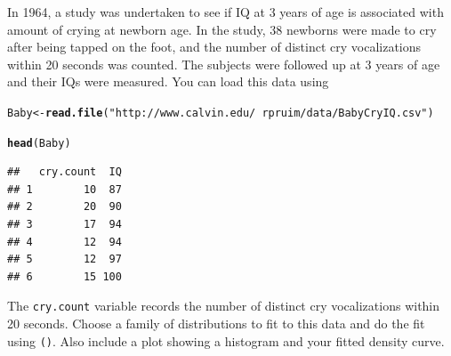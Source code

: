\documentclass[twoside]{book}\usepackage[]{graphicx}\usepackage[]{xcolor}
\makeatletter
\newcommand{\hlstr}[1]{\textcolor[rgb]{0.192,0.494,0.8}{#1}}%
\newcommand{\hlstd}[1]{\textcolor[rgb]{0.345,0.345,0.345}{#1}}%
\newcommand{\hlkwb}[1]{\textcolor[rgb]{0.69,0.353,0.396}{#1}}%
\newcommand{\hlkwd}[1]{\textcolor[rgb]{0.737,0.353,0.396}{\textbf{#1}}}%
\newenvironment{kframe}{%
 \def\at@end@of@kframe{}%
 \ifinner\ifhmode%
  \def\at@end@of@kframe{\end{minipage}}%
  \begin{minipage}{\columnwidth}%
 \fi\fi%
 \def\FrameCommand##1{\hskip\@totalleftmargin \hskip-\fboxsep
 \colorbox{shadecolor}{##1}\hskip-\fboxsep
     \hskip-\linewidth \hskip-\@totalleftmargin \hskip\columnwidth}%
 \MakeFramed {\advance\hsize-\width
   \@totalleftmargin\z@ \linewidth\hsize
   \@setminipage}}%
 {\par\unskip\endMakeFramed%
 \at@end@of@kframe}
\newenvironment{knitrout}{}{} %
\newcommand{\variable}[1]{{\color{green!50!black}\texttt{#1}}}
\newcommand{\Rindex}[1]{\index{\texttt{#1}}}
\newcommand{\dataframe}[1]{{\color{blue!80!black}\texttt{#1}}\Rindex{#1}}
\newcommand{\function}[1]{{\color{purple!75!blue}\texttt{\StrSubstitute{#1}{()}{}()}}\Rindex{#1}}
\makeatother
\begin{document}
\begin{problem}
	In 1964, a study was undertaken to see if IQ at 3 years of age is
	associated with amount of crying at newborn age. In the study, 38 newborns
	were made to cry after being tapped on the foot, and the number of distinct
	cry vocalizations within 20 seconds was counted.
	The subjects were followed up at 3 years of age and their IQs were measured.
	You can load this data using
\begin{knitrout}
\color{fgcolor}\begin{kframe}
\begin{alltt}
\hlstd{Baby} \hlkwb{<-} \hlkwd{read.file}\hlstd{(}\hlstr{"http://www.calvin.edu/~rpruim/data/BabyCryIQ.csv"}\hlstd{)}
\end{alltt}


{\ttfamily\noindent\itshape\color{messagecolor}{\#\# Reading data with read.csv()}}\begin{alltt}
\hlkwd{head}\hlstd{(Baby)}
\end{alltt}
\begin{verbatim}
##   cry.count  IQ
## 1        10  87
## 2        20  90
## 3        17  94
## 4        12  94
## 5        12  97
## 6        15 100
\end{verbatim}
\end{kframe}
\end{knitrout}

	The \variable{cry.count} variable records the number of distinct cry vocalizations 
	within 20 seconds.  Choose a family of distributions to fit to this data
	and do the fit using \function{fitdistr()}. Also include a plot showing 
	a histogram and your fitted density curve.
\end{problem}
\end{document}
